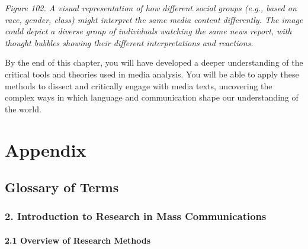 \documentclass[
]{book}
\begin{document}
\emph{Figure 102. A visual representation of how different social groups (e.g., based on race, gender, class) might interpret the same media content differently. The image could depict a diverse group of individuals watching the same news report, with thought bubbles showing their different interpretations and reactions.}

By the end of this chapter, you will have developed a deeper understanding of the critical tools and theories used in media analysis. You will be able to apply these methods to dissect and critically engage with media texts, uncovering the complex ways in which language and communication shape our understanding of the world.

\chapter{Appendix}\label{appendix-1}

\section{Glossary of Terms}\label{glossary-of-terms}

\subsection*{\texorpdfstring{2. \textbf{Introduction to Research in Mass Communications}}{2. Introduction to Research in Mass Communications}}\label{introduction-to-research-in-mass-communications}

\subsubsection*{\texorpdfstring{\textbf{2.1 Overview of Research Methods}}{2.1 Overview of Research Methods}}\label{overview-of-research-methods-1}
\end{document}
